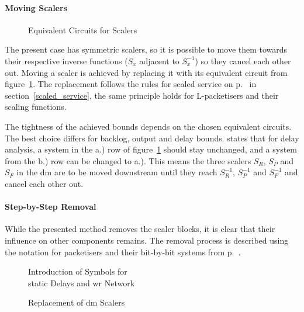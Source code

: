 \paragraph{Moving Scalers}

\begin{figure}[H]
  \centering
  \def\svgwidth{0.8\textwidth}
  
  \caption{Equivalent Circuits for Scalers}
  \label{fig:scaler_order}
\end{figure}
\noindent
The present case has symmetric scalers, so it is possible to move them towards their respective inverse functions ($S_x$ adjacent to $S^{-1}_x$)
so they cancel each other out.
Moving a scaler is achieved by replacing it with its equivalent circuit from figure~\ref{fig:scaler_order}.
The replacement follows the rules for scaled service on p.~\pageref{scaled_service} in section~\ref{scaled_service},
the same principle holds for L-packetisers and their scaling functions.
\par
The tightness of the achieved bounds depends on the chosen equivalent circuits. The best choice differs for
backlog, output and delay bounds. 
\cite[p. 294 (8)]{fidler_way_2006} states that for delay analysis, a system in the a.) row of figure~\ref{fig:scaler_order} should stay unchanged,
and a system from the b.) row can be changed to a.). This means the three scalers $S_R$, $S_P$ and $S_F$ in the \gls{dm} are to be moved downstream
until they reach  $S^{-1}_R$, $S^{-1}_P$ and $S^{-1}_F$ and cancel each other out.
 
 
\paragraph{Step-by-Step Removal}
While the presented method removes the scaler blocks, it is clear that their influence on other components remains.
The removal process is described using the notation for packetisers and their bit-by-bit systems from p.~\pageref{sec:e2e_da}. 

\begin{figure}[H]
  \centering
  \def\svgwidth{0.95\textheight}
   \vspace*{-10mm}
 \hspace*{-10mm}
  \caption{Introduction of Symbols for\\static Delays and \gls{wr} Network}
  \label{fig:block2}
\end{figure}

\begin{figure}[H]
  \centering
  \def\svgwidth{0.95\textheight}
  \vspace*{-10mm}
 \hspace*{-10mm}
  \caption{Replacement of \gls{dm} Scalers}
  \label{fig:block3}
\end{figure}

